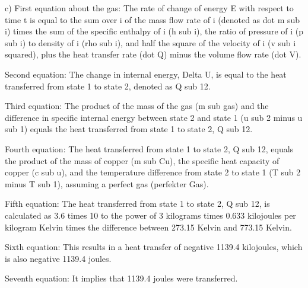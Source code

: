 c) First equation about the gas:
The rate of change of energy E with respect to time t is equal to the sum over i of the mass flow rate of i (denoted as dot m sub i) times the sum of the specific enthalpy of i (h sub i), the ratio of pressure of i (p sub i) to density of i (rho sub i), and half the square of the velocity of i (v sub i squared), plus the heat transfer rate (dot Q) minus the volume flow rate (dot V).

Second equation:
The change in internal energy, Delta U, is equal to the heat transferred from state 1 to state 2, denoted as Q sub 12.

Third equation:
The product of the mass of the gas (m sub gas) and the difference in specific internal energy between state 2 and state 1 (u sub 2 minus u sub 1) equals the heat transferred from state 1 to state 2, Q sub 12.

Fourth equation:
The heat transferred from state 1 to state 2, Q sub 12, equals the product of the mass of copper (m sub Cu), the specific heat capacity of copper (c sub u), and the temperature difference from state 2 to state 1 (T sub 2 minus T sub 1), assuming a perfect gas (perfekter Gas).

Fifth equation:
The heat transferred from state 1 to state 2, Q sub 12, is calculated as 3.6 times 10 to the power of 3 kilograms times 0.633 kilojoules per kilogram Kelvin times the difference between 273.15 Kelvin and 773.15 Kelvin.

Sixth equation:
This results in a heat transfer of negative 1139.4 kilojoules, which is also negative 1139.4 joules.

Seventh equation:
It implies that 1139.4 joules were transferred.